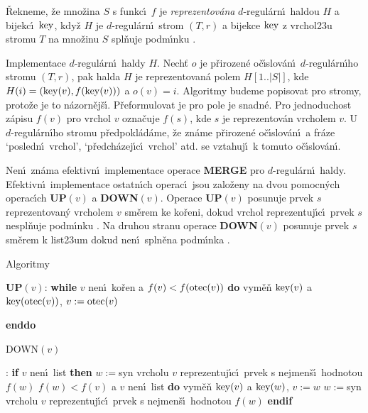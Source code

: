 \flushpar\v Rekneme, \v ze mno\v zina $S$ s funkc\'\i\ $f$ je 
\emph{reprezentov\'ana} $d$-regul\'ar\-n\'\i\ haldou $H$ a bijekc\'\i\ $\operatorname{key}$, kdy\v z 
$H$ je $d$-regul\'arn\'\i\ strom $(T,r)$ a bijekce $\operatorname{key}$ z vrchol\accent23u 
stromu $T$ na mno\v zinu $S$ spl\v nuje podm\'\i nku .  
\medskip

\flushpar Implementace $d$-regul\'arn\'\i\ haldy $H$. Nech\v t $o$ je 
p\v rirozen\'e o\v c\'\i s\-lo\-v\'a\-n\'\i\ $d$-regul\'arn\'\i ho stromu $
(T,r)$, pak halda $H$ je 
reprezentovan\'a polem $H[1..|S|]$, kde $H(i)=(\operatorname{key}(v),f(\operatorname{key}(v)))$ a 
$o(v)=i$. Algoritmy budeme popisovat pro stromy, proto\v ze 
je to n\'azor\-n\v ej\-\v s\'\i . P\v reformulovat je pro pole je 
snadn\'e. Pro jednoduchost z\'apisu $f(v)$ pro vrchol $v$ 
ozna\v cuje $f(s)$, kde $s$ je reprezentov\'an vrcholem $v$. U 
$d$-regul\'arn\'\i ho stromu p\v redpo\-kl\'a\-d\'ame, \v ze zn\'ame p\v rirozen\'e 
o\v c\'\i slov\'an\'\i\ a fr\'aze `posledn\'\i\ vrchol', `p\v red\-ch\'azej\'\i c\'\i\ 
vrchol'  atd. se vztahuj\'\i\ k tomuto o\v c\'\i slov\'a\-n\'\i .
\medskip

\flushpar Nen\'\i\ zn\'ama efektivn\'\i\ implementace operace 
{\bf MERGE} pro $d$-regul\'arn\'\i\ haldy.  Efektivn\'\i\ implementace 
ostatn\'\i ch operac\'\i\ jsou zalo\v zeny na dvou pomocn\'ych 
operac\'\i ch {\bf UP$(v)$} a {\bf DOWN$(v)$}.  Operace {\bf UP$(
v)$} posunuje 
prvek $s$ reprezentovan\'y vrcholem $v$ sm\v erem ke ko\v reni, 
dokud vrchol reprezentuj\'\i c\'\i\ prvek $s$ nespl\v nu\-je podm\'\i nku 
. Na druhou stranu operace {\bf DOWN$(v)$} posunuje prvek $s$ sm\v erem k 
list\accent23um dokud nen\'\i\ spln\v ena podm\'\i nka \thetag{usp}.  
\bigskip

\subhead
Algoritmy
\endsubhead
\medskip

{\bf UP$(v)$}:\newline 
{\bf while} $v$ nen\'\i\ ko\v ren a $f(v)<f(\operatorname{otec}(v))$ {\bf do}\newline 
\phantom{---}vym\v e\v n $\operatorname{key}(v)$ a $\operatorname{key}(\operatorname{otec}(v))$, $v:=\operatorname{otec}(v)$\newline 
{\bf enddo
\medskip

DOWN$(v)$}:\newline 
{\bf if} $v$ nen\'\i\ list {\bf then\newline}
\phantom{---}$w:=$syn vrcholu $v$ reprezentuj\'\i c\'\i\ prvek s nejmen\v s\'\i\ 
hodnotou $f(w)$\newline 
\phantom{---}{\bf while} $f(w)<f(v)$ a $v$ nen\'\i\ list {\bf do\newline }
\phantom{------}vym\v e\v n $\operatorname{key}(v)$ a $\operatorname{key}(w)$, $v:=w$\newline 
\phantom{------}$w:=$syn vrcholu $v$ reprezentuj\'\i c\'\i\ prvek s nejmen\v s\'\i\ 
hodnotou $f(w)$\newline 
\phantom{---}{\bf enddo}\newline 
{\bf endif}
\medskip

